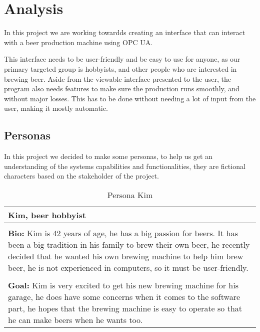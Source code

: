 
\section{Analysis}

In this project we are working towardds creating an interface that can interact with a beer production machine using OPC UA. \newline

This interface needs to be user-friendly and be easy to use for anyone, as our primary targeted group is hobbyists, and other people who are interested in brewing beer. \newline
Aside from the viewable interface presented to the user, the program also needs features to make sure the production runs smoothly, and without major losses. \newline
This has to be done without needing a lot of input from the user, making it mostly automatic.

\subsection{Personas}
In this project we decided to make some personas, to help us get an understanding of the systems capabilities and functionalities, they are fictional characters based on the stakeholder of the project. \newline

\begin{table}[htb]
    \begin{center}
        \begin{tabular}{|p{16cm}|}
            \hline
            \textbf{Kim, beer hobbyist}                                                                                                                                                                                                                        \\
            \hline
            \\ \textbf{Bio:} Kim is 42 years of age, he has a big passion for beers. It has been a big tradition in his family to brew their own beer, he recently decided that he wanted his own brewing machine to help him brew beer, he is not experienced in computers, so it must be user-friendly.  \\
            \\
            \textbf{Goal:} Kim is very excited to get his new brewing machine for his garage, he does have some concerns when it comes to the software part, he hopes that the brewing machine is easy to operate so that he can make beers when he wants too. \\
            \hline
        \end{tabular}
        \caption{Persona Kim}
        \label{tab:persona_kim}
    \end{center}
\end{table}

